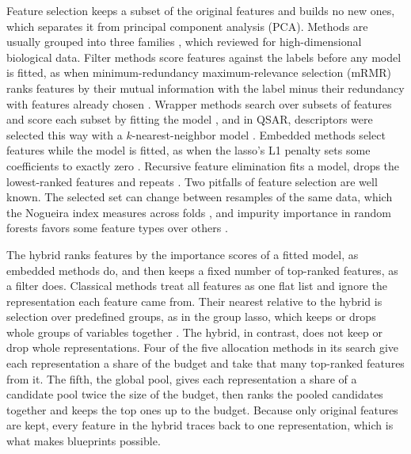 Feature selection keeps a subset of the original features and builds no new ones, which separates it from principal component analysis (PCA). Methods are usually grouped into three families \citep{Guyon2003}, which \citet{Saeys2007} reviewed for high-dimensional biological data. Filter methods score features against the labels before any model is fitted, as when minimum-redundancy maximum-relevance selection (mRMR) ranks features by their mutual information with the label minus their redundancy with features already chosen \citep{Peng2005}. Wrapper methods search over subsets of features and score each subset by fitting the model \citep{Kohavi1997}, and in QSAR, descriptors were selected this way with a $k$-nearest-neighbor model \citep{Zheng2000}. Embedded methods select features while the model is fitted, as when the lasso's L1 penalty sets some coefficients to exactly zero \citep{Tibshirani1996}. Recursive feature elimination fits a model, drops the lowest-ranked features and repeats \citep{Guyon2002}. Two pitfalls of feature selection are well known. The selected set can change between resamples of the same data, which the Nogueira index measures across folds \citep{Nogueira2018}, and impurity importance in random forests favors some feature types over others \citep{Strobl2007}.

The hybrid ranks features by the importance scores of a fitted model, as embedded methods do, and then keeps a fixed number of top-ranked features, as a filter does. Classical methods treat all features as one flat list and ignore the representation each feature came from. Their nearest relative to the hybrid is selection over predefined groups, as in the group lasso, which keeps or drops whole groups of variables together \citep{Yuan2006}. The hybrid, in contrast, does not keep or drop whole representations. Four of the five allocation methods in its search give each representation a share of the budget and take that many top-ranked features from it. The fifth, the global pool, gives each representation a share of a candidate pool twice the size of the budget, then ranks the pooled candidates together and keeps the top ones up to the budget. Because only original features are kept, every feature in the hybrid traces back to one representation, which is what makes blueprints possible.


